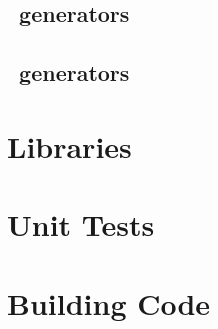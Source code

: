 \subsection{\say~generators}

\subsection{\ask~generators}

\section{Libraries}

\section{Unit Tests}

\section{Building Code}
